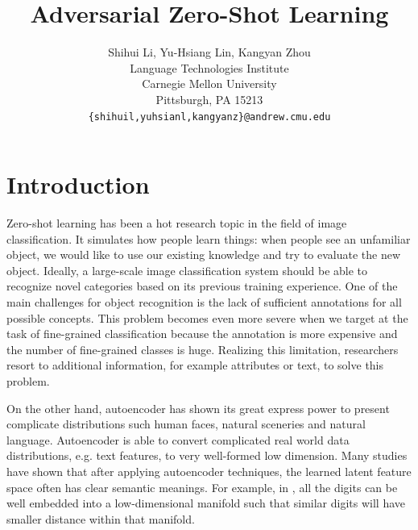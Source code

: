 \documentclass{article}
\title{Adversarial Zero-Shot Learning}
\author{
	Shihui Li, Yu-Hsiang Lin, Kangyan Zhou
		\\
	Language Technologies Institute\\
	Carnegie Mellon University\\
	Pittsburgh, PA 15213 \\
	\texttt{\{shihuil,yuhsianl,kangyanz\}@andrew.cmu.edu} \\
}
\begin{document}

\maketitle







\section{Introduction}

Zero-shot learning has been a hot research topic in the field of image classification. It simulates how people learn things: when people see an unfamiliar object, we would like to use our existing knowledge and try to evaluate the new object. Ideally, a large-scale image classification system should be able to recognize novel categories based on its previous training experience. One of the main challenges for object recognition is the lack of sufficient annotations for all possible concepts. This problem becomes even more severe when we target at the task of fine-grained classification because the annotation is more expensive and the number of fine-grained classes is huge. Realizing this limitation, researchers resort to additional information, for example attributes or text, to solve this problem.  

On the other hand, autoencoder has shown its great express power to present complicate distributions such human faces, natural sceneries and natural language. Autoencoder is able to convert complicated real world data distributions, e.g. text features, to very well-formed low dimension. Many studies have shown that after applying autoencoder techniques, the learned latent feature space often has clear semantic meanings. For example, in \cite{makhzani2015adversarial}, all the digits can be well embedded into a low-dimensional manifold such that similar digits will have smaller distance within that manifold.

 \par 
\end{document}
